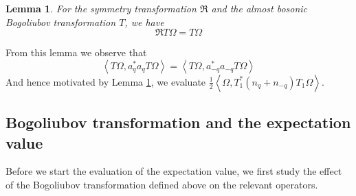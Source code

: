 \documentclass[sn-mathphys, Numbered ,a4paper]{sn-jnl}%
\newcommand{\half}{\frac{1}{2}}
\newcommand{\eva}[1]{\left\langle #1 \right\rangle}
\theoremstyle{plain}
\newtheorem{lemma}[theorem]{Lemma}
\theoremstyle{definition}
\theoremstyle{remark}
\theoremstyle{plain}
\theoremstyle{definition}
\theoremstyle{remark}
\begin{document}
\begin{lemma}\label{lem:symtransformation}
    For the symmetry transformation $\mathfrak{R}$ and the almost bosonic Bogoliubov transformation $T$, we have
    \begin{equation}
        \mathfrak{R}T\Omega = T\Omega
    \end{equation}
\end{lemma}
From this lemma we observe that 
\begin{equation}
    \eva{T\Omega, a^*_qa_qT\Omega} = \eva{T\Omega, a^*_{-q}a_{-q}T\Omega}
\end{equation}
And hence motivated by Lemma \ref{lem:symtransformation}, we evaluate $\half\eva{\Omega, T_1^*\left(n_q+n_{-q}\right)T_1\Omega}$.

\subsection{Bogoliubov transformation and the expectation value}
Before we start the evaluation of the expectation value, we first study the effect of the Bogoliubov transformation defined above on the relevant operators.
\end{document}

